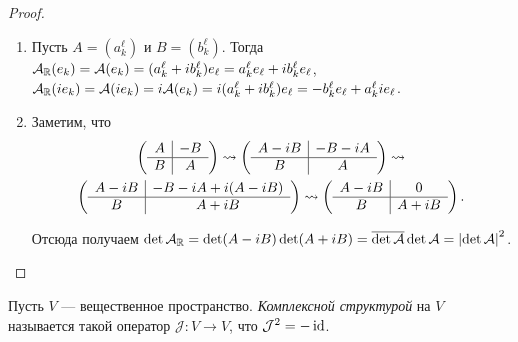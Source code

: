 \begin{proof}
    \begin{enumerate}
        \item Пусть $A = (a^\ell_k)$ и $B = (b^\ell_k)$. Тогда $\mathcal{A}_{\mathbb{R}}(e_k) = \mathcal{A}(e_k) = (a^\ell_k + ib^\ell_k)e_\ell = a^\ell_ke_\ell + ib^\ell_ke_\ell$, $\mathcal{A}_{\mathbb{R}}(ie_k) = \mathcal{A}(ie_k) = i\mathcal{A}(e_k) = i(a^\ell_k + ib^\ell_k)e_\ell = -b^\ell_ke_\ell + a^\ell_kie_\ell$.
        \item Заметим, что
            \begin{multline*}
                \left(
                \begin{array}{c | c}
                    A & -B\\
                    \hline
                    B & A
                \end{array}
                \right) \leadsto
                \left(
                \begin{array}{c | c}
                    A - iB & -B - iA\\
                    \hline
                    B & A
                \end{array}
                \right) \leadsto\\
                \left(
                \begin{array}{c | c}
                    A - iB & -B - iA + i(A - iB)\\
                    \hline
                    B & A + iB
                \end{array}
                \right) \leadsto
                \left(
                \begin{array}{c | c}
                    A - iB & 0\\
                    \hline
                    B & A + iB
                \end{array}
                \right).
            \end{multline*}

            Отсюда получаем $\det\mathcal{A}_{\mathbb{R}} = \det(A - iB)\det(A + iB) = \overline{\det\mathcal{A}}\det\mathcal{A} = \left\lvert\det\mathcal{A}\right\rvert^2$.
    \end{enumerate}
\end{proof}

\begin{definition}
    Пусть $V$ --- вещественное пространство. \textit{Комплексной структурой} на $V$ называется такой оператор $\mathcal{J}: V \to V$, что $\mathcal{J}^2 = -\operatorname{id}$.
\end{definition}

